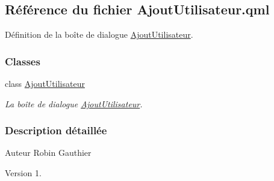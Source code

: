 \hypertarget{_ajout_utilisateur_8qml}{}\subsection{Référence du fichier Ajout\+Utilisateur.\+qml}
\label{_ajout_utilisateur_8qml}


Définition de la boîte de dialogue \hyperlink{class_ajout_utilisateur}{Ajout\+Utilisateur}.  


\subsubsection*{Classes}
\begin{DoxyCompactItemize}
\item 
class \hyperlink{class_ajout_utilisateur}{Ajout\+Utilisateur}
\begin{DoxyCompactList}\small\item\em La boîte de dialogue \hyperlink{class_ajout_utilisateur}{Ajout\+Utilisateur}. \end{DoxyCompactList}\end{DoxyCompactItemize}


\subsubsection{Description détaillée}
\begin{DoxyAuthor}{Auteur}
Robin Gauthier
\end{DoxyAuthor}
\begin{DoxyVersion}{Version}
1. 
\end{DoxyVersion}
